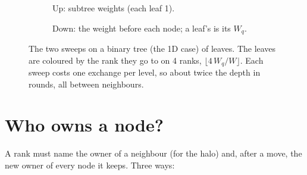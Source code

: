 \documentclass[10pt,a4paper]{article}
\theoremstyle{definition}
\begin{document}
\begin{figure}[h]
  \centering
  \begin{subfigure}[t]{0.48\textwidth}
    \centering
    \begin{tikzpicture}\end{tikzpicture}
    \caption{Up: subtree weights (each leaf 1).}
  \end{subfigure}\hfill
  \begin{subfigure}[t]{0.48\textwidth}
    \centering
    \begin{tikzpicture}\end{tikzpicture}
    \caption{Down: the weight before each node; a leaf's is its $W_q$.}
  \end{subfigure}
  \caption{The two sweeps on a binary tree (the 1D case) of \zleaves{}
    leaves. The leaves are coloured by the rank they go to on 4 ranks,
    $\lfloor 4\,W_q / W \rfloor$. Each sweep costs one exchange per level,
    so about twice the depth in rounds, all between neighbours.}
  \label{fig:zweights}
\end{figure}

\section{Who owns a node?}

A rank must name the owner of a neighbour (for the halo) and, after a
move, the new owner of every node it keeps. Three ways:
\end{document}
